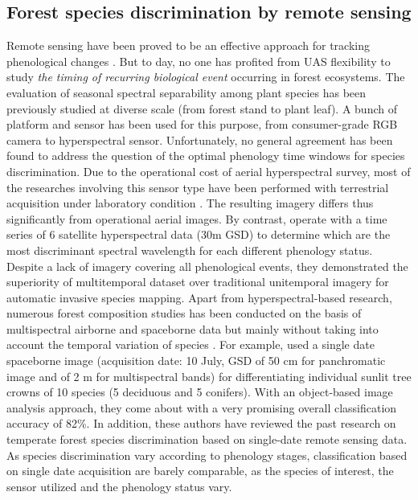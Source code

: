 \documentclass[remotesensing,article,submit,moreauthors,pdftex,12pt,a4paper]{mdpi} %
\begin{document}
\subsection{Forest species discrimination by remote sensing}


Remote sensing have been proved to be an effective approach for tracking phenological changes \cite{motohka_applicability_2010}. 
But to day, no one has profited from UAS flexibility to study \textit{the timing of recurring biological event} occurring in forest ecosystems. 
The evaluation of seasonal spectral separability among plant species has been previously studied at diverse scale (from forest stand to plant leaf). 
A bunch of platform and sensor has been used for this purpose, from consumer-grade RGB camera to hyperspectral sensor. 
Unfortunately, no general agreement has been found to address the question of the optimal phenology time windows for species discrimination. 
Due to the operational cost of aerial hyperspectral survey, most of the researches involving this sensor type have been performed with terrestrial acquisition under laboratory condition \cite{burkholder_seasonal_2011, masaitis_influence_2013,cole_spectral_2014}. 
The resulting imagery differs thus significantly from operational aerial images. 
By contrast, \citeauthor{somers_multi-temporal_2013} \cite{somers_multi-temporal_2013} operate with a time series of 6 satellite hyperspectral data (30m GSD) to determine which are the most discriminant spectral wavelength for each different phenology status. 
Despite a lack of imagery covering all phenological  events, they demonstrated the superiority of multitemporal dataset over traditional unitemporal imagery for automatic invasive species mapping.
Apart from hyperspectral-based research, numerous forest composition studies has been conducted on the basis of multispectral airborne and spaceborne data but mainly without taking into account the temporal variation of species \cite{heinzel_full_2008}. 
For example, \citeauthor{immitzer_tree_2012} \cite{immitzer_tree_2012} used a single date spaceborne image (acquisition date: 10 July,  GSD of 50 cm for panchromatic image and of 2 m for multispectral bands) for differentiating individual sunlit tree crowns of 10 species (5 deciduous and 5 conifers). 
With an object-based image analysis approach, they come about with a very promising overall classification accuracy of 82\%. 
In addition, these authors have reviewed the past research on temperate forest species discrimination based on single-date remote sensing data. 
As species discrimination vary according to phenology stages, classification based on single date acquisition are barely comparable, as the species of interest, the sensor utilized and the phenology status vary. 
\end{document}
